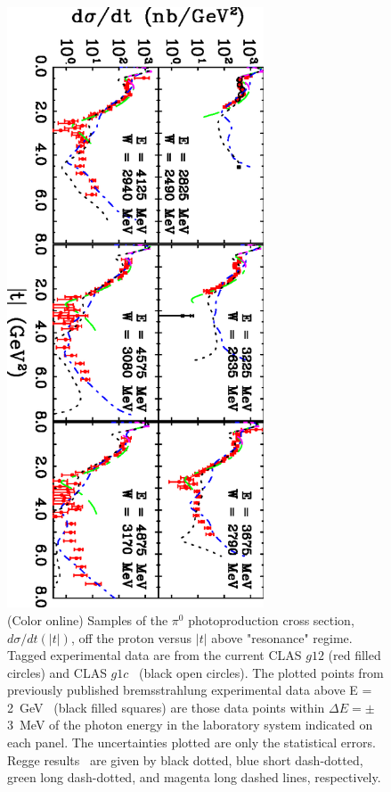 \documentclass[aps,prc,twocolumn,floatfix,showpacs,preprintnumbers,amsmath,amssymb,superscriptaddress]{revtex4-1}
\begin{document}
\begin{figure}[htb!]
\centerline{
        \includegraphics[width=3in, angle=90]{dsdt.eps}}

        \caption {(Color online) Samples of the $\pi^0$ 
		photoproduction cross section, $d\sigma/dt(|t|)$, 
		off the proton versus $|t|$ above "resonance" 
		regime.  Tagged experimental data are from the 
		current CLAS $g12$ (red filled circles) and CLAS 
		$g1c$~\protect\cite{du07} (black open circles). 
		The plotted points from previously published 
		bremsstrahlung experimental data above E = 
		2~GeV~\protect\cite{brem} (black filled squares) 
		are those data points within $\Delta E = \pm$3~MeV 
		of the photon energy in the laboratory system indicated on 
		each panel. The uncertainties plotted are only the statistical errors. 
		Regge results~\protect\cite{Goldstein,Laget,
		Mathieu,Donnachie} are given by black dotted, 
		blue short dash-dotted, green long dash-dotted, 
		and magenta long dashed lines, respectively.} 
		\label{fig:t_data}
\end{figure}
\end{document}
